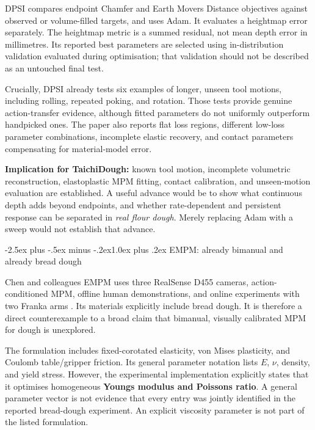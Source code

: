 \documentclass[
  11pt,
]{article}
\makeatletter
\renewcommand\subsection{\needspace{5\baselineskip}\@startsection{subsection}{2}{\z@}%
  {-2.5ex plus -.5ex minus -.2ex}{1.0ex plus .2ex}%
  {\normalfont\sffamily\large\bfseries\color{accent}}}
\makeatother
\begin{document}
DPSI compares endpoint Chamfer and Earth Mover\textquotesingle s
Distance objectives against observed or volume-filled targets, and uses
Adam. It evaluates a heightmap error separately. The heightmap metric is
a summed residual, not mean depth error in millimetres. Its reported
best parameters are selected using in-distribution validation evaluated
during optimisation; that validation should not be described as an
untouched final test.

Crucially, DPSI already tests six examples of longer, unseen tool
motions, including rolling, repeated poking, and rotation. Those tests
provide genuine action-transfer evidence, although fitted parameters do
not uniformly outperform handpicked ones. The paper also reports flat
loss regions, different low-loss parameter combinations, incomplete
elastic recovery, and contact parameters compensating for material-model
error.

\textbf{Implication for TaichiDough:} known tool motion, incomplete
volumetric reconstruction, elastoplastic MPM fitting, contact
calibration, and unseen-motion evaluation are established. A useful
advance would be to show what continuous depth adds beyond endpoints,
and whether rate-dependent and persistent response can be separated in
\emph{real flour dough}. Merely replacing Adam with a sweep would not
establish that advance.

\subsection{EMPM: already bimanual and already bread
dough}\label{empm-already-bimanual-and-already-bread-dough}

Chen and colleagues\textquotesingle{} EMPM uses three RealSense D455
cameras, action-conditioned MPM, offline human demonstrations, and
online experiments with two Franka arms
. Its materials explicitly include
bread dough. It is therefore a direct counterexample to a broad claim
that bimanual, visually calibrated MPM for dough is unexplored.

The formulation includes fixed-corotated elasticity, von Mises
plasticity, and Coulomb table/gripper friction. Its general parameter
notation lists \(E\), \(\nu\), density, and yield stress. However, the
experimental implementation explicitly states that it optimises
homogeneous \textbf{Young\textquotesingle s modulus and
Poisson\textquotesingle s ratio}. A general parameter vector is not
evidence that every entry was jointly identified in the reported
bread-dough experiment. An explicit viscosity parameter is not part of
the listed formulation.
\end{document}
